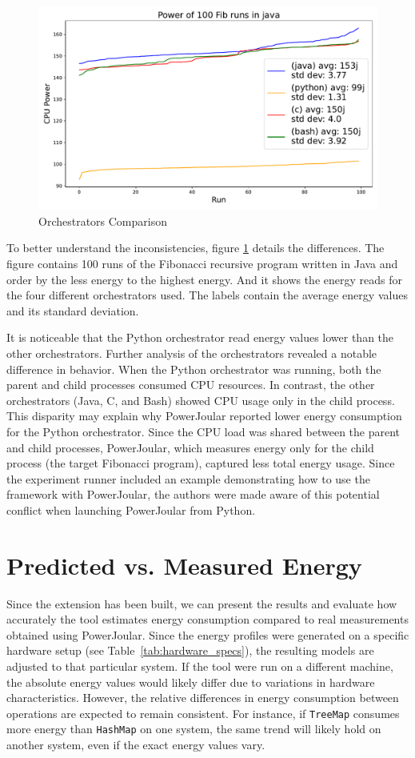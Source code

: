 \begin{figure}[htbp]
  \centering
  \includegraphics[width = .8 \textwidth]{figures/4_orchs_comparison.pdf}
  \caption{Orchestrators Comparison}
  \label{fig:4_orchs_comparison}
\end{figure}

To better understand the inconsistencies, figure \ref{fig:4_orchs_comparison} details the differences.
The figure contains 100 runs of the Fibonacci recursive program written in Java and order by the less energy to the highest energy. And it shows the energy reads for the four different orchestrators used. The labels contain the average energy values and its standard deviation.

It is noticeable that the Python orchestrator read energy values lower than the other orchestrators. Further analysis of the orchestrators revealed a notable difference in behavior. When the Python orchestrator was running, both the parent and child processes consumed CPU resources. In contrast, the other orchestrators (Java, C, and Bash) showed CPU usage only in the child process. This disparity may explain why PowerJoular reported lower energy consumption for the Python orchestrator. Since the CPU load was shared between the parent and child processes, PowerJoular, which measures energy only for the child process (the target Fibonacci program), captured less total energy usage.
Since the experiment runner included an example demonstrating how to use the framework with PowerJoular, the authors were made aware of this potential conflict when launching PowerJoular from Python.

\section{Predicted vs. Measured Energy} \label{sec:predicted_vs_measured_energy}

Since the extension has been built, we can present the results and evaluate how accurately the tool estimates energy consumption compared to real measurements obtained using PowerJoular. Since the energy profiles were generated on a specific hardware setup (see Table~\ref{tab:hardware_specs}), the resulting models are adjusted to that particular system. If the tool were run on a different machine, the absolute energy values would likely differ due to variations in hardware characteristics. However, the relative differences in energy consumption between operations are expected to remain consistent. For instance, if \texttt{TreeMap} consumes more energy than \texttt{HashMap} on one system, the same trend will likely hold on another system, even if the exact energy values vary.

